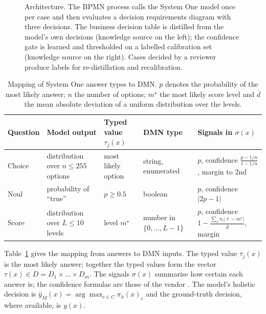 \documentclass[a4paper,fleqn]{cas-sc}
\theoremstyle{definition}
\begin{document}
\begin{figure}[pos=tbp]
  \centering
  \resizebox{\textwidth}{!}{}
  \caption{Architecture. The BPMN process calls the System One model once per case and then evaluates a decision requirements diagram with three decisions. The business decision table is distilled from the model's own decisions (knowledge source on the left); the confidence gate is learned and thresholded on a labelled calibration set (knowledge source on the right). Cases decided by a reviewer produce labels for re-distillation and recalibration.}
  \label{fig:architecture}
\end{figure}

\begin{table}[pos=tbp]
  \centering
  \caption{Mapping of System One answer types to DMN. $p$ denotes the probability of the most likely answer; $n$ the number of options; $m^\star$ the most likely score level and $\bar d$ the mean absolute deviation of a uniform distribution over the levels.}
  \label{tab:types}
  \small
  \begin{tabularx}{\textwidth}{@{}l>{\raggedright\arraybackslash}X>{\raggedright\arraybackslash}p{2.4cm}>{\raggedright\arraybackslash}p{2.6cm}>{\raggedright\arraybackslash}X@{}}
    \toprule
    Question & Model output & Typed value $\tau_j(x)$ & DMN type & Signals in $\sigma(x)$ \\
    \midrule
    Choice & distribution over $n\le 255$ options & most likely option & string, enumerated & $p$, confidence $\frac{p-1/n}{1-1/n}$, margin to 2nd \\
    Noul & probability of ``true'' & $p \ge 0.5$ & boolean & $p$, confidence $|2p-1|$ \\
    Score & distribution over $L\le 10$ levels & level $m^\star$ & number in $\{0,\dots,L-1\}$ & $p$, confidence $1-\frac{\sum_\ell \pi_\ell |\ell-m^\star|}{\bar d}$, margin \\
    \bottomrule
  \end{tabularx}
\end{table}

Table~\ref{tab:types} gives the mapping from answers to DMN inputs. The typed value $\tau_j(x)$ is the most likely answer; together the typed values form the vector $\tau(x)\in D=D_1\times\dots\times D_m$. The signals $\sigma(x)$ summarise how certain each answer is; the confidence formulas are those of the vendor \citep{typesafe2026docs}. The model's holistic decision is $\hat y_M(x)=\arg\max_{c\in C}\pi_h(x)_c$ and the ground-truth decision, where available, is $y(x)$.
\end{document}
